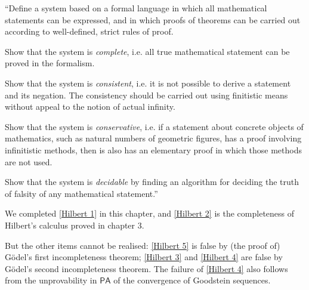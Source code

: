 \documentclass[a4paper, 11pt]{amsart}
\theoremstyle{remark}
\newcommand{\axiomft}[1]{\mathsf{#1}}
\newcommand{\PA}{\axiomft{PA}}
\newenvironment{enumerate-(1)}{\begin{enumerate}[label={\upshape (\arabic*)}, leftmargin=2pc]}{\end{enumerate}}
\begin{document}
\begin{enumerate-(1)} 
\item 
\label{Hilbert 1} 
``Define a system based on a formal language in which all mathematical statements can be expressed, and in which proofs of theorems can be carried out according to well-defined, strict rules of proof. 
\item 
\label{Hilbert 2} 
Show that the system is \emph{complete}, i.e. all true mathematical statement can be proved in the formalism. 
\item 
\label{Hilbert 3} 
Show that the system is \emph{consistent}, i.e. it is not possible to derive a statement and its negation. 
The consistency should be carried out using finitistic means without appeal to the notion of actual infinity. 
\item 
\label{Hilbert 4} 
Show that the system is \emph{conservative}, i.e. if a statement about concrete objects of mathematics, such as natural numbers of geometric figures, has a proof involving infinitistic methods, then is also has an elementary proof in which those methods are not used. 
\item 
\label{Hilbert 5} 
Show that the system is \emph{decidable} by finding an algorithm for deciding the truth of falsity of any mathematical statement.'' 
\end{enumerate-(1)} 

We completed \ref{Hilbert 1} in this chapter, and \ref{Hilbert 2} is the completeness of Hilbert's calculus proved in chapter 3. 

But the other items cannot be realised: 
\ref{Hilbert 5} is false by (the proof of) G\"odel's first incompleteness theorem; 
\ref{Hilbert 3} and \ref{Hilbert 4} are false by G\"odel's second incompleteness theorem. 
The failure of \ref{Hilbert 4} also follows from the unprovability in $\PA$ of the convergence of Goodstein sequences. 



\iffalse 

\newpage 
\end{document}
